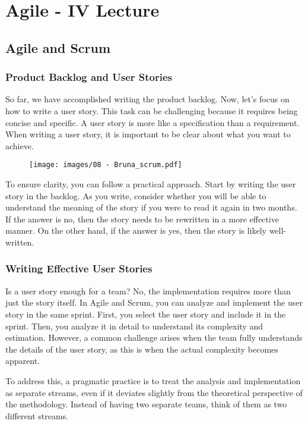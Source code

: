 \section{Agile - IV Lecture}

\subsection{Agile and Scrum}

\subsubsection{Product Backlog and User Stories}

So far, we have accomplished writing the product backlog. Now, let's
focus on how to write a user story. This task can be challenging because
it requires being concise and specific. A user story is more like a
specification than a requirement. When writing a user story, it is
important to be clear about what you want to achieve.

\begin{figure}[!h]
    \centering
    \texttt{[image: images/08 - Bruna\_scrum.pdf]}
\end{figure}

To ensure clarity, you can follow a practical approach. Start by writing
the user story in the backlog. As you write, consider whether you will
be able to understand the meaning of the story if you were to read it
again in two months. If the answer is no, then the story needs to be
rewritten in a more effective manner. On the other hand, if the answer
is yes, then the story is likely well-written.

\subsubsection{Writing Effective User Stories}

Is a user story enough for a team? No, the implementation requires more
than just the story itself. In Agile and Scrum, you can analyze and
implement the user story in the same sprint. First, you select the user
story and include it in the sprint. Then, you analyze it in detail to
understand its complexity and estimation. However, a common challenge
arises when the team fully understands the details of the user story, as
this is when the actual complexity becomes apparent.

To address this, a pragmatic practice is to treat the analysis and
implementation as separate streams, even if it deviates slightly from
the theoretical perspective of the methodology. Instead of having two
separate teams, think of them as two different streams.

